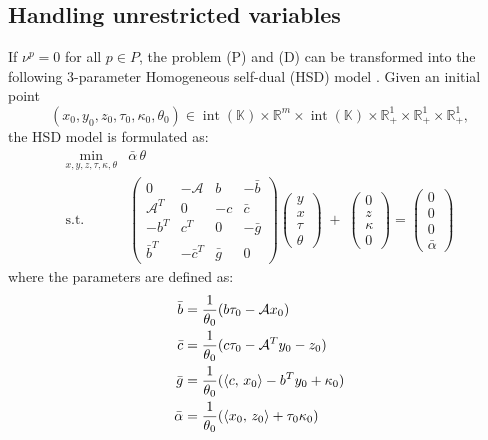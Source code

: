 \subsection{Handling unrestricted variables}
If $\nu^p = 0$ for all $p \in P$, the problem (P) and (D) can be transformed into the following 3-parameter Homogeneous self-dual (HSD) model \cite{Wright1997}.
Given an initial point 
\[
(x_0, y_0, z_0, \tau_0, \kappa_0, \theta_0) \in 
  \operatorname{int}(\mathbb{K}) \times \mathbb{R}^m \times \operatorname{int}(\mathbb{K})
  \times \mathbb{R}^1_+ \times \mathbb{R}^1_+ \times \mathbb{R}^1_+,
\]
the HSD model is formulated as:
\[
  \begin{array}{cl}
   \min_{x,y,z,\tau,\kappa,\theta} & \bar{\alpha}\,\theta \\[3pt]
   \text{s.t.}
   & \begin{pmatrix}
       0 & -\mathcal{A} & b & -\bar{b}\\
       \mathcal{A}^T & 0 & -c & \bar{c}\\
       -b^T & c^T & 0 & -\bar{g}\\
       \bar{b}^T & -\bar{c}^T & \bar{g} & 0
     \end{pmatrix}
     \begin{pmatrix} y \\ x \\ \tau \\ \theta \end{pmatrix}
   \;+\;
     \begin{pmatrix} 0 \\ z \\ \kappa \\ 0 \end{pmatrix}
   =
     \begin{pmatrix} 0 \\ 0 \\ 0 \\ \bar{\alpha} \end{pmatrix}
  \end{array}
\]
where the parameters are defined as:
\begin{align*}
    \bar{b} &= \frac{1}{\theta_0}(b\tau_0 - \mathcal{A}x_0) \\
    \bar{c} &= \frac{1}{\theta_0}(c\tau_0 - \mathcal{A}^T y_0 - z_0) \\
    \bar{g} &= \frac{1}{\theta_0}(\left\langle c, \, x_0 \right\rangle - b^Ty_0 + \kappa_0) \\
    \bar{\alpha} &= \frac{1}{\theta_0} (\left\langle x_0, \, z_0 \right\rangle + \tau_0 \kappa_0)
\end{align*}


